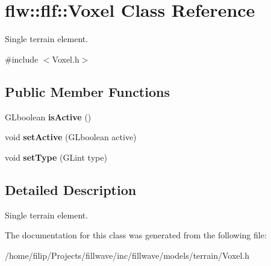 \hypertarget{classflw_1_1flf_1_1Voxel}{}\section{flw\+:\+:flf\+:\+:Voxel Class Reference}
\label{classflw_1_1flf_1_1Voxel}


Single terrain element.  




{\ttfamily \#include $<$Voxel.\+h$>$}

\subsection*{Public Member Functions}
\begin{DoxyCompactItemize}
\item 
G\+Lboolean {\bfseries is\+Active} ()\hypertarget{classflw_1_1flf_1_1Voxel_ac4066a31aee514f2045affc6456b9f06}{}\label{classflw_1_1flf_1_1Voxel_ac4066a31aee514f2045affc6456b9f06}

\item 
void {\bfseries set\+Active} (G\+Lboolean active)\hypertarget{classflw_1_1flf_1_1Voxel_a2ac5955ffd95984c466096334e4072b1}{}\label{classflw_1_1flf_1_1Voxel_a2ac5955ffd95984c466096334e4072b1}

\item 
void {\bfseries set\+Type} (G\+Lint type)\hypertarget{classflw_1_1flf_1_1Voxel_a4dc2cac166662f44dc4ced9170f20a8c}{}\label{classflw_1_1flf_1_1Voxel_a4dc2cac166662f44dc4ced9170f20a8c}

\end{DoxyCompactItemize}


\subsection{Detailed Description}
Single terrain element. 

The documentation for this class was generated from the following file\+:\begin{DoxyCompactItemize}
\item 
/home/filip/\+Projects/fillwave/inc/fillwave/models/terrain/Voxel.\+h\end{DoxyCompactItemize}
